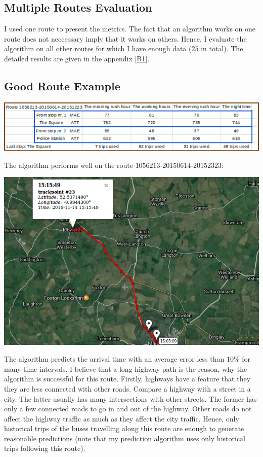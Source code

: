 \documentclass[12pt,a4paper,oneside,openright]{report}
\begin{document}
\subsection{Multiple Routes Evaluation}

I used one route to present the metrics. The fact that an algorithm works on one route
does not neccessary imply that it works on others. Hence, I evaluate the algorithm on
all other routes for which I have enough data ($25$ in total). The
detailed results are given in the appendix \textcolor{blue}{\ref{B1}}. \\

\subsection*{Good Route Example}

\includegraphics[width=\textwidth]{figs/table_of_1056213.png}

The algorithm performs well on the route $1056213$-$20150614$-$20152323$:

\includegraphics[scale=0.65]{figs/best_route.png}

The algorithm predicts the arrival time with an average error less than $10\%$ for
many time intervals. I believe that a long highway path is the reason, why the algorithm
is successful for this route. Firstly, highways have a feature that they they are less
connected with other roads. Compare a highway with a street in a city. The latter usually has many
intersections with other streets. The former has only a few connected roads to go in and out
of the highway. Other roads do not affect the highway traffic as much as they affect the city traffic.
Hence, only historical trips of the buses travelling along this route are enough to generate
reasonable predictions (note that my prediction algorithm uses only historical trips
following this route). \\ 
\end{document}
